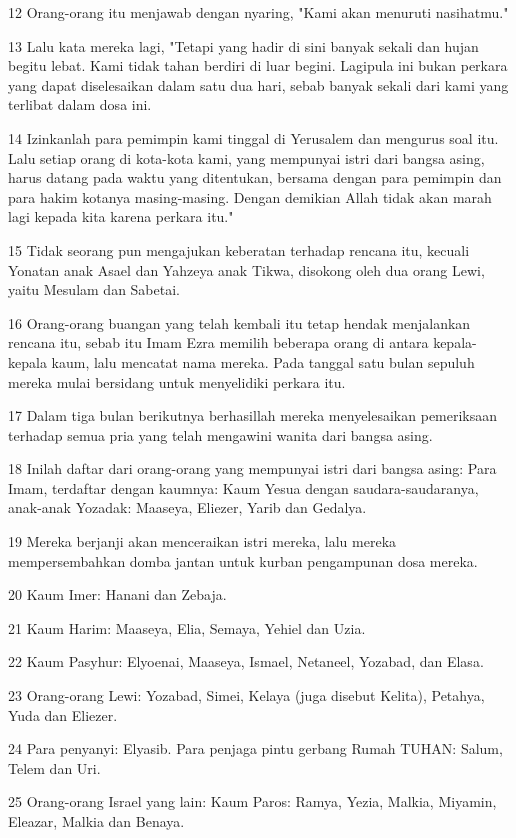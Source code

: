 \par 12 Orang-orang itu menjawab dengan nyaring, "Kami akan menuruti nasihatmu."
\par 13 Lalu kata mereka lagi, "Tetapi yang hadir di sini banyak sekali dan hujan begitu lebat. Kami tidak tahan berdiri di luar begini. Lagipula ini bukan perkara yang dapat diselesaikan dalam satu dua hari, sebab banyak sekali dari kami yang terlibat dalam dosa ini.
\par 14 Izinkanlah para pemimpin kami tinggal di Yerusalem dan mengurus soal itu. Lalu setiap orang di kota-kota kami, yang mempunyai istri dari bangsa asing, harus datang pada waktu yang ditentukan, bersama dengan para pemimpin dan para hakim kotanya masing-masing. Dengan demikian Allah tidak akan marah lagi kepada kita karena perkara itu."
\par 15 Tidak seorang pun mengajukan keberatan terhadap rencana itu, kecuali Yonatan anak Asael dan Yahzeya anak Tikwa, disokong oleh dua orang Lewi, yaitu Mesulam dan Sabetai.
\par 16 Orang-orang buangan yang telah kembali itu tetap hendak menjalankan rencana itu, sebab itu Imam Ezra memilih beberapa orang di antara kepala-kepala kaum, lalu mencatat nama mereka. Pada tanggal satu bulan sepuluh mereka mulai bersidang untuk menyelidiki perkara itu.
\par 17 Dalam tiga bulan berikutnya berhasillah mereka menyelesaikan pemeriksaan terhadap semua pria yang telah mengawini wanita dari bangsa asing.
\par 18 Inilah daftar dari orang-orang yang mempunyai istri dari bangsa asing: Para Imam, terdaftar dengan kaumnya: Kaum Yesua dengan saudara-saudaranya, anak-anak Yozadak: Maaseya, Eliezer, Yarib dan Gedalya.
\par 19 Mereka berjanji akan menceraikan istri mereka, lalu mereka mempersembahkan domba jantan untuk kurban pengampunan dosa mereka.
\par 20 Kaum Imer: Hanani dan Zebaja.
\par 21 Kaum Harim: Maaseya, Elia, Semaya, Yehiel dan Uzia.
\par 22 Kaum Pasyhur: Elyoenai, Maaseya, Ismael, Netaneel, Yozabad, dan Elasa.
\par 23 Orang-orang Lewi: Yozabad, Simei, Kelaya (juga disebut Kelita), Petahya, Yuda dan Eliezer.
\par 24 Para penyanyi: Elyasib. Para penjaga pintu gerbang Rumah TUHAN: Salum, Telem dan Uri.
\par 25 Orang-orang Israel yang lain: Kaum Paros: Ramya, Yezia, Malkia, Miyamin, Eleazar, Malkia dan Benaya.
